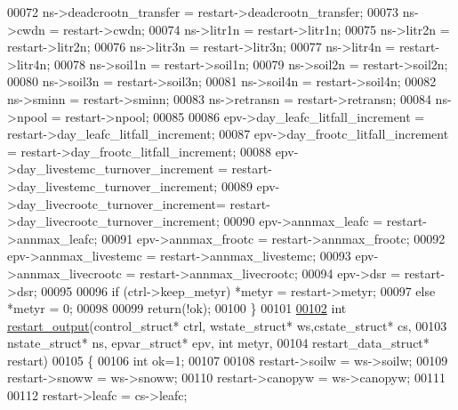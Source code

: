 \begin{DoxyCode}
00072     ns->deadcrootn\_transfer               = restart->deadcrootn\_transfer;
00073     ns->cwdn                              = restart->cwdn;
00074     ns->litr1n                            = restart->litr1n;
00075     ns->litr2n                            = restart->litr2n;
00076     ns->litr3n                            = restart->litr3n;
00077     ns->litr4n                            = restart->litr4n;
00078     ns->soil1n                            = restart->soil1n;
00079     ns->soil2n                            = restart->soil2n;
00080     ns->soil3n                            = restart->soil3n;
00081     ns->soil4n                            = restart->soil4n;
00082     ns->sminn                             = restart->sminn;
00083     ns->retransn                          = restart->retransn;
00084     ns->npool                             = restart->npool;
00085     
00086     epv->day\_leafc\_litfall\_increment      = restart->day\_leafc\_litfall\_increment;
00087     epv->day\_frootc\_litfall\_increment     = restart->day\_frootc\_litfall\_increment;
00088     epv->day\_livestemc\_turnover\_increment = restart->day\_livestemc\_turnover\_increment;
00089     epv->day\_livecrootc\_turnover\_increment= restart->day\_livecrootc\_turnover\_increment;
00090     epv->annmax\_leafc                     = restart->annmax\_leafc;
00091     epv->annmax\_frootc                    = restart->annmax\_frootc;
00092     epv->annmax\_livestemc                 = restart->annmax\_livestemc;
00093     epv->annmax\_livecrootc                = restart->annmax\_livecrootc;
00094     epv->dsr                              = restart->dsr;
00095     
00096     \textcolor{keywordflow}{if} (ctrl->keep\_metyr) *metyr          = restart->metyr; 
00097     \textcolor{keywordflow}{else}                  *metyr          = 0;
00098     
00099     \textcolor{keywordflow}{return}(!ok);
00100 \}
00101 
\hypertarget{restart__io_8c_source_l00102}{}\hyperlink{restart__io_8c_a87ed6bc3ef6e9be39f3f0363ee89fbc3}{00102} \textcolor{keywordtype}{int} \hyperlink{restart__io_8c_a87ed6bc3ef6e9be39f3f0363ee89fbc3}{restart\_output}(control\_struct* ctrl, wstate\_struct* ws,cstate\_struct* cs,
00103     nstate\_struct* ns, epvar\_struct* epv, \textcolor{keywordtype}{int} metyr,
00104     restart\_data\_struct* restart)
00105 \{
00106     \textcolor{keywordtype}{int} ok=1;
00107     
00108     restart->soilw                            = ws->soilw;
00109     restart->snoww                            = ws->snoww;
00110     restart->canopyw                          = ws->canopyw;
00111 
00112     restart->leafc                            = cs->leafc;

\end{DoxyCode}
